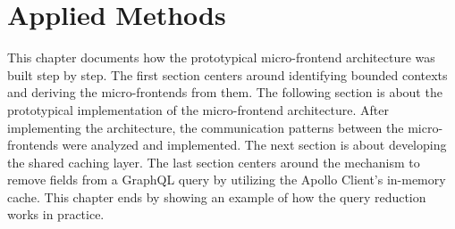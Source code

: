 \chapter{Applied Methods}\label{chapter:applied-methods}

This chapter documents how the prototypical micro-frontend architecture was built step by step. The first section centers around identifying bounded contexts and deriving the micro-frontends from them. The following section is about the prototypical implementation of the micro-frontend architecture. After implementing the architecture, the communication patterns between the micro-frontends were analyzed and implemented. The next section is about developing the shared caching layer. The last section centers around the mechanism to remove fields from a GraphQL query by utilizing the Apollo Client's in-memory cache. This chapter ends by showing an example of how the query reduction works in practice.


%




% 

